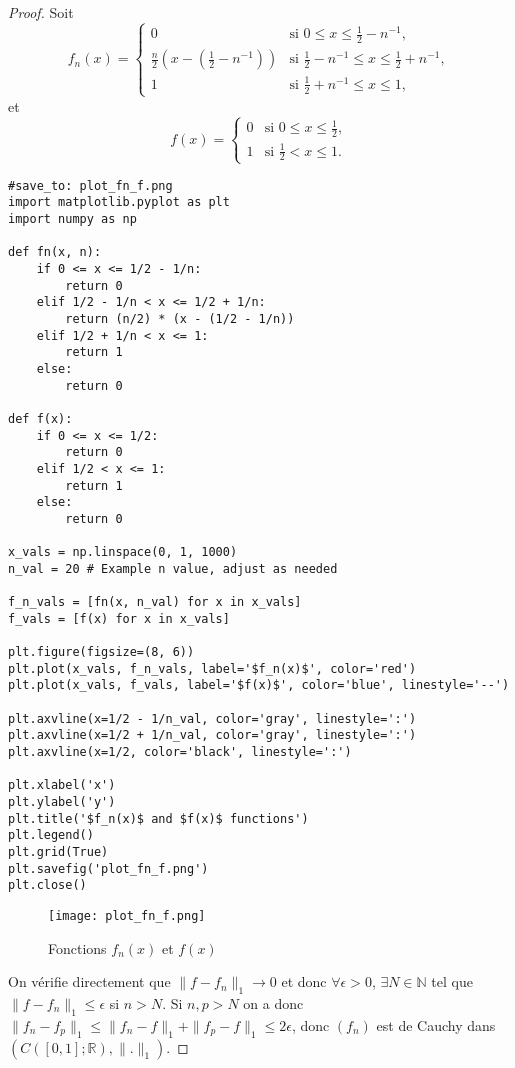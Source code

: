 \documentclass{article}
\begin{document}
\begin{proof}
Soit
\begin{equation}
    f_n(x) =
    \begin{cases}
        0 & \text{si } 0 \leq x \leq \frac{1}{2} - n^{-1}, \\
        \frac{n}{2}(x - (\frac{1}{2} - n^{-1})) & \text{si } \frac{1}{2} - n^{-1} \leq x \leq \frac{1}{2} + n^{-1}, \\
        1 & \text{si } \frac{1}{2} + n^{-1} \leq x \leq 1,
    \end{cases}
\end{equation}
et
\begin{equation}
    f(x) =
    \begin{cases}
        0 & \text{si } 0 \leq x \leq \frac{1}{2}, \\
        1 & \text{si } \frac{1}{2} < x \leq 1.
    \end{cases}
\end{equation}

\begin{verbatim}
#save_to: plot_fn_f.png
import matplotlib.pyplot as plt
import numpy as np

def fn(x, n):
    if 0 <= x <= 1/2 - 1/n:
        return 0
    elif 1/2 - 1/n < x <= 1/2 + 1/n:
        return (n/2) * (x - (1/2 - 1/n))
    elif 1/2 + 1/n < x <= 1:
        return 1
    else:
        return 0

def f(x):
    if 0 <= x <= 1/2:
        return 0
    elif 1/2 < x <= 1:
        return 1
    else:
        return 0

x_vals = np.linspace(0, 1, 1000)
n_val = 20 # Example n value, adjust as needed

f_n_vals = [fn(x, n_val) for x in x_vals]
f_vals = [f(x) for x in x_vals]

plt.figure(figsize=(8, 6))
plt.plot(x_vals, f_n_vals, label='$f_n(x)$', color='red')
plt.plot(x_vals, f_vals, label='$f(x)$', color='blue', linestyle='--')

plt.axvline(x=1/2 - 1/n_val, color='gray', linestyle=':')
plt.axvline(x=1/2 + 1/n_val, color='gray', linestyle=':')
plt.axvline(x=1/2, color='black', linestyle=':')

plt.xlabel('x')
plt.ylabel('y')
plt.title('$f_n(x)$ and $f(x)$ functions')
plt.legend()
plt.grid(True)
plt.savefig('plot_fn_f.png')
plt.close()

\end{verbatim}

\begin{figure}[h]
    \centering
    \texttt{[image: plot\_fn\_f.png]}
    \caption{Fonctions $f_n(x)$ et $f(x)$}
    \label{fig:plot_fn_f}
\end{figure}
On vérifie directement que $\|f - f_n\|_1 \rightarrow 0$ et donc $\forall \epsilon > 0$, $\exists N \in \mathbb{N}$ tel que $\|f - f_n\|_1 \leq \epsilon$ si $n > N$. Si $n, p > N$ on a donc $\|f_n - f_p\|_1 \leq \|f_n - f\|_1 + \|f_p - f\|_1 \leq 2\epsilon$, donc $(f_n)$ est de Cauchy dans $(C([0, 1]; \mathbb{R}), \|.\|_1)$.


\end{proof}
\end{document}
